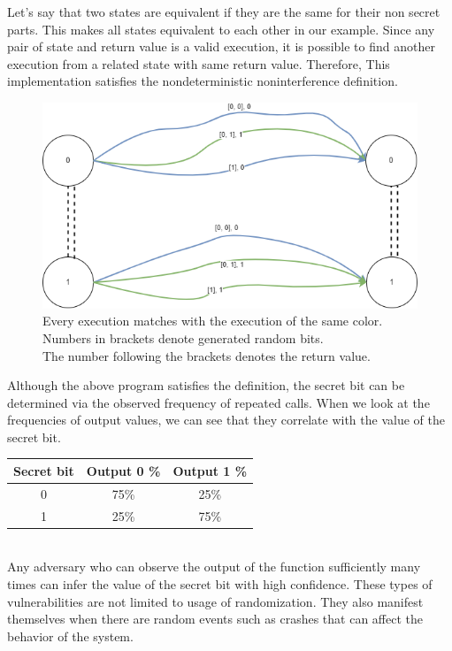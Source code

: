 Let’s say that two states are equivalent if they are the same for their non secret parts. This makes all states equivalent to each other in our example. Since any pair of state and return value is a valid execution, it is possible to find another execution from a related state with same return value. Therefore, This implementation satisfies the nondeterministic noninterference definition. 

\begin{figure}[ht]
    \centering
    \includegraphics[scale=0.5]{templates/figures/matching-paths.png}
    \caption{Every execution matches with the execution of the same color.\\
    Numbers in brackets denote generated random bits. \\The number following the brackets denotes the return value.}
    \label{fig:NI_Matching_Paths}
\end{figure}

Although the above program satisfies the definition, the secret bit can be determined via the observed frequency of repeated calls. When we look at the frequencies of output values, we can see that they correlate with the value of the secret bit. \\

\begin{tabular}{| c | c | c |}
	\hline
	Secret bit & Output 0 \% & Output 1 \% \\
	\hline
	0 &	75\% & 25\% \\
	\hline
	1 &	25\% & 75\% \\
	\hline
\end{tabular}\\

Any adversary who can observe the output of the function sufficiently many times can infer the value of the secret bit with high confidence. These types of vulnerabilities are not limited to usage of randomization. They also manifest themselves when there are random events such as crashes that can affect the behavior of the system.


